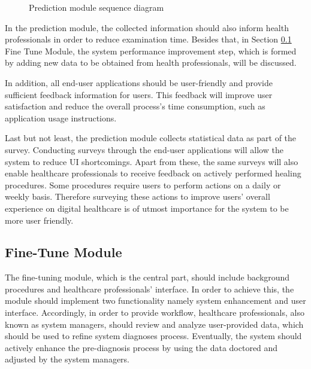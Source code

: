 \begin{figure}[htbp]
\centering
{}
\caption{Prediction module sequence diagram}
\label{fig:PredictionModuleSequenceDiagram}
\end{figure}

In the prediction module, the collected information should also inform health professionals in order to reduce examination time. Besides that, in Section \ref{sec:FineTuneModule} Fine Tune Module, the system performance improvement step, which is formed by adding new data to be obtained from health professionals, will be discussed.

In addition, all end-user applications should be user-friendly and provide sufficient feedback information for users. This feedback will improve user satisfaction and reduce the overall process's time consumption, such as application usage instructions.

Last but not least, the prediction module collects statistical data as part of the survey. Conducting surveys through the end-user applications will allow the system to reduce UI shortcomings. Apart from these, the same surveys will also enable healthcare professionals to receive feedback on actively performed healing procedures. Some procedures require users to perform actions on a daily or weekly basis. Therefore surveying these actions to improve users' overall experience on digital healthcare is of utmost importance for the system to be more user friendly.

\subsection{ Fine-Tune Module }\label{sec:FineTuneModule}

The fine-tuning module, which is the central part, should include background procedures and healthcare professionals' interface. In order to achieve this, the module should implement two functionality namely system enhancement and user interface. Accordingly, in order to provide  workflow, healthcare professionals, also known as system managers, should review and analyze user-provided data, which should be used to refine system diagnoses process. Eventually, the system should actively enhance the pre-diagnosis process by using the data doctored and adjusted by the system managers.

